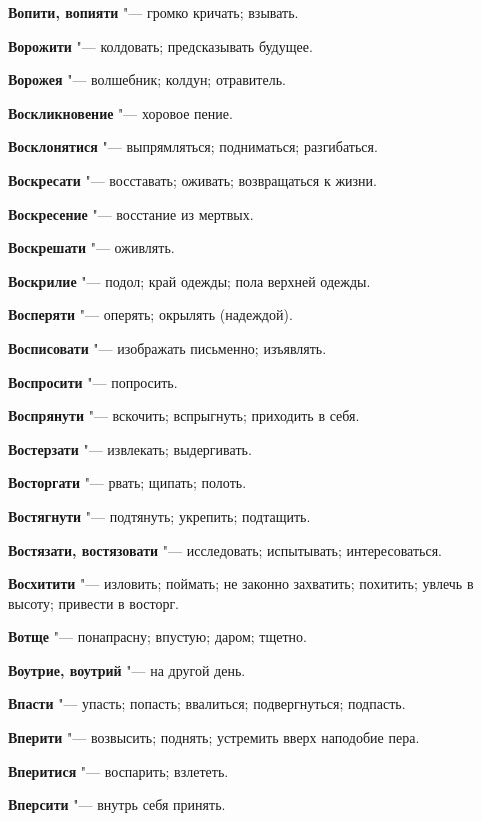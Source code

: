 \begin{mymulticols}
\noindent\textbf{Вопити, вопияти} "--- громко кричать; взывать. 

\noindent\textbf{Ворожити} "--- колдовать; предсказывать будущее. 

\noindent\textbf{Ворожея} "--- волшебник; колдун; отравитель. 

\noindent\textbf{Воскликновение} "--- хоровое пение. 

\noindent\textbf{Восклонятися} "--- выпрямляться; подниматься; разгибаться. 

\noindent\textbf{Воскресати} "--- восставать; оживать; возвращаться к жизни. 

\noindent\textbf{Воскресение} "--- восстание из мертвых. 

\noindent\textbf{Воскрешати} "--- оживлять. 

\noindent\textbf{Воскрилие} "--- подол; край одежды; пола верхней одежды. 

\noindent\textbf{Восперяти} "--- оперять; окрылять (надеждой). 

\noindent\textbf{Восписовати} "--- изображать письменно; изъявлять. 

\noindent\textbf{Воспросити} "--- попросить. 

\noindent\textbf{Воспрянути} "--- вскочить; вспрыгнуть; приходить в себя. 

\noindent\textbf{Востерзати} "--- извлекать; выдергивать. 

\noindent\textbf{Восторгати} "--- рвать; щипать; полоть. 

\noindent\textbf{Востягнути} "--- подтянуть; укрепить; подтащить. 

\noindent\textbf{Востязати, востязовати} "--- исследовать; испытывать; интересоваться. 

\noindent\textbf{Восхитити} "--- изловить; поймать; не законно захватить; похитить; увлечь в высоту; привести в восторг. 

\noindent\textbf{Вотще} "--- понапрасну; впустую; даром; тщетно. 

\noindent\textbf{Воутрие, воутрий} "--- на другой день. 

\noindent\textbf{Впасти} "--- упасть; попасть; ввалиться; подвергнуться; подпасть. 

\noindent\textbf{Вперити} "--- возвысить; поднять; устремить вверх наподобие пера. 

\noindent\textbf{Вперитися} "--- воспарить; взлететь. 

\noindent\textbf{Вперсити} "--- внутрь себя принять. 


\end{mymulticols}
